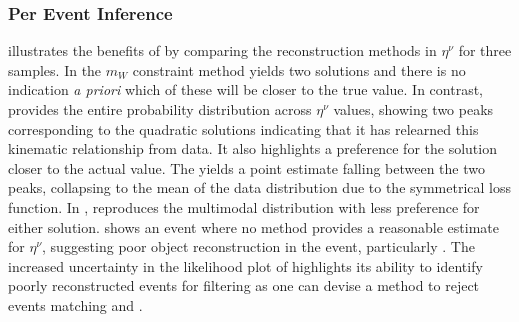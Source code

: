 \subsubsection{Per Event Inference}

 illustrates the benefits of \vflows by comparing the reconstruction methods in $\eta^\nu$ for three samples.
In  the $m_W$ constraint method yields two solutions and there is no indication \textit{a priori} which of these will be closer to the true value.
In contrast, \vflows provides the entire probability distribution across $\eta^\nu$ values, showing two peaks corresponding to the quadratic solutions indicating that it has relearned this kinematic relationship from data.
It also highlights a preference for the solution closer to the actual value.
The \vff yields a point estimate falling between the two peaks, collapsing to the mean of the data distribution due to the symmetrical loss function.
In , \vflows reproduces the multimodal distribution with less preference for either solution.
 shows an event where no method provides a reasonable estimate for $\eta^\nu$, suggesting poor object reconstruction in the event, particularly \ptmiss.
The increased uncertainty in the likelihood plot of \vflows highlights its ability to identify poorly reconstructed events for filtering as one can devise a method to reject events matching  and .

